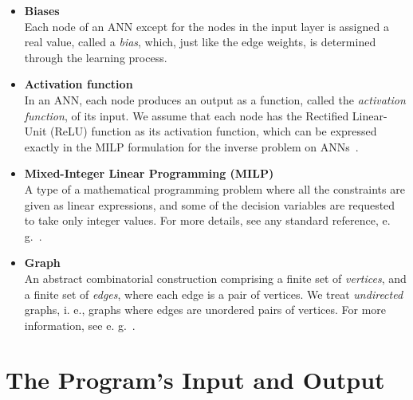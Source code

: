 \documentclass[11pt, titlepage, dvipdfmx, twoside]{article}
\begin{document}
\begin{itemize}
\item {\bf Biases}\\
Each node of an ANN except for the nodes in the input layer
is assigned a real value, called a {\em bias},
which, just like the edge weights, is determined through the learning process.


\item {\bf Activation function}\\
%
In an ANN, each node produces an output as a function, called the \emph{activation function}, 
of its input.
We assume that each node has the Rectified Linear-Unit (ReLU) function 
as its activation function,
which can be expressed exactly in the MILP formulation
for the inverse problem on ANNs~\cite{AN19}.

\item {\bf Mixed-Integer Linear Programming (MILP)}\\
%
A type of a mathematical programming problem
where all the constraints are given as linear expressions, and
some of the decision variables are requested to take
only integer values.
For more details, see any standard reference, e. g.~\cite{LP}.


\item {\bf Graph} \\
An abstract combinatorial construction comprising
a finite set of {\em vertices}, and a finite set of {\em edges},
where each edge is a pair of vertices.
We treat {\em undirected} graphs,
i. e., graphs where edges are unordered pairs of vertices.
For more information, see e. g.~\cite{graph}.





\end{itemize}


\section{The Program's Input and Output}
\label{sec:InOut}
\end{document}

